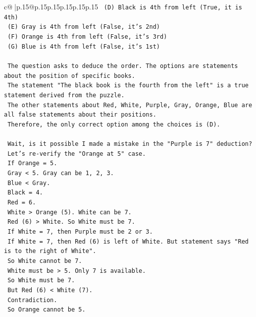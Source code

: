 \documentclass{article}
\begin{document}
{\begin{supertabular}{c@{$\;$}|p{.15\linewidth}@{}p{.15\linewidth}p{.15\linewidth}p{.15\linewidth}p{.15\linewidth}p{.15\linewidth}}
{{{\texttt{    (D) Black is 4th from left (True, it is 4th)} \\
\texttt{    (E) Gray is 4th from left (False, it's 2nd)} \\
\texttt{    (F) Orange is 4th from left (False, it's 3rd)} \\
\texttt{    (G) Blue is 4th from left (False, it's 1st)} \\
\\ 
\texttt{    The question asks to deduce the order. The options are statements about the position of specific books.} \\
\texttt{    The statement "The black book is the fourth from the left" is a true statement derived from the puzzle.} \\
\texttt{    The other statements about Red, White, Purple, Gray, Orange, Blue are all false statements about their positions.} \\
\texttt{    Therefore, the only correct option among the choices is (D).} \\
\\ 
\texttt{    Wait, is it possible I made a mistake in the "Purple is 7" deduction?} \\
\texttt{    Let's re{-}verify the "Orange at 5" case.} \\
\texttt{    If Orange = 5.} \\
\texttt{    Gray < 5. Gray can be 1, 2, 3.} \\
\texttt{    Blue < Gray.} \\
\texttt{    Black = 4.} \\
\texttt{    Red = 6.} \\
\texttt{    White > Orange (5). White can be 7.} \\
\texttt{    Red (6) > White. So White must be 7.} \\
\texttt{    If White = 7, then Purple must be 2 or 3.} \\
\texttt{    If White = 7, then Red (6) is left of White. But statement says "Red is to the right of White".} \\
\texttt{    So White cannot be 7.} \\
\texttt{    White must be > 5. Only 7 is available.} \\
\texttt{    So White must be 7.} \\
\texttt{    But Red (6) < White (7).} \\
\texttt{    Contradiction.} \\
\texttt{    So Orange cannot be 5.} \\
\\ 
}}}
\end{supertabular}}
\end{document}
